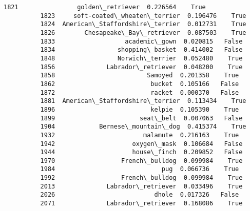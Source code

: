 \documentclass[11pt]{article}
\begin{document}
\begin{Verbatim}[commandchars=\\\{\}]
          1821                golden\_retriever  0.226564    True   
          1823     soft-coated\_wheaten\_terrier  0.196476    True   
          1824  American\_Staffordshire\_terrier  0.012731    True   
          1826        Chesapeake\_Bay\_retriever  0.087503    True   
          1833                   academic\_gown  0.020815   False   
          1834                 shopping\_basket  0.414002   False   
          1848                 Norwich\_terrier  0.052480    True   
          1856              Labrador\_retriever  0.048200    True   
          1858                         Samoyed  0.201358    True   
          1862                          bucket  0.105166   False   
          1872                          racket  0.000370   False   
          1881  American\_Staffordshire\_terrier  0.113434    True   
          1896                          kelpie  0.105390    True   
          1899                       seat\_belt  0.007063   False   
          1904            Bernese\_mountain\_dog  0.415374    True   
          1932                        malamute  0.216163    True   
          1942                     oxygen\_mask  0.106684   False   
          1944                     house\_finch  0.209852   False   
          1970                  French\_bulldog  0.099984    True   
          1984                             pug  0.066736    True   
          1992                  French\_bulldog  0.099984    True   
          2013              Labrador\_retriever  0.033496    True   
          2026                           dhole  0.017326   False   
          2071              Labrador\_retriever  0.168086    True   
          

\end{Verbatim}
\end{document}
